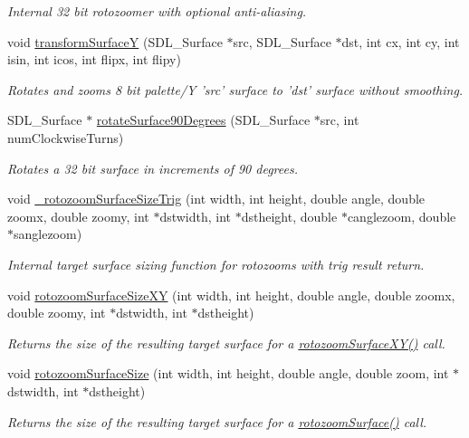 \begin{DoxyCompactItemize}
\begin{DoxyCompactList}\small\item\em Internal 32 bit rotozoomer with optional anti-\/aliasing. \end{DoxyCompactList}\item 
void \hyperlink{a00044_a126e3b96b22cc18e78e33cc1f8eb6c3c}{transformSurfaceY} (SDL\_\-Surface $\ast$src, SDL\_\-Surface $\ast$dst, int cx, int cy, int isin, int icos, int flipx, int flipy)
\begin{DoxyCompactList}\small\item\em Rotates and zooms 8 bit palette/Y 'src' surface to 'dst' surface without smoothing. \end{DoxyCompactList}\item 
SDL\_\-Surface $\ast$ \hyperlink{a00044_a77563d68634cb2624d4f2f0bcdc19e73}{rotateSurface90Degrees} (SDL\_\-Surface $\ast$src, int numClockwiseTurns)
\begin{DoxyCompactList}\small\item\em Rotates a 32 bit surface in increments of 90 degrees. \end{DoxyCompactList}\item 
void \hyperlink{a00044_af48638a298820d4d1dd24a13896963d8}{\_\-rotozoomSurfaceSizeTrig} (int width, int height, double angle, double zoomx, double zoomy, int $\ast$dstwidth, int $\ast$dstheight, double $\ast$canglezoom, double $\ast$sanglezoom)
\begin{DoxyCompactList}\small\item\em Internal target surface sizing function for rotozooms with trig result return. \end{DoxyCompactList}\item 
void \hyperlink{a00044_aee64992d26c818d9975610754d5c929b}{rotozoomSurfaceSizeXY} (int width, int height, double angle, double zoomx, double zoomy, int $\ast$dstwidth, int $\ast$dstheight)
\begin{DoxyCompactList}\small\item\em Returns the size of the resulting target surface for a \hyperlink{a00036_a454d4234a45eab6ec238a40cc44051d4}{rotozoomSurfaceXY()} call. \end{DoxyCompactList}\item 
void \hyperlink{a00044_a9886c783255edfd70a4974f8f3dd5a8c}{rotozoomSurfaceSize} (int width, int height, double angle, double zoom, int $\ast$dstwidth, int $\ast$dstheight)
\begin{DoxyCompactList}\small\item\em Returns the size of the resulting target surface for a \hyperlink{a00036_a3cb0c11d5edc929579c807dc7612348c}{rotozoomSurface()} call. \end{DoxyCompactList}\item 

\end{DoxyCompactItemize}

